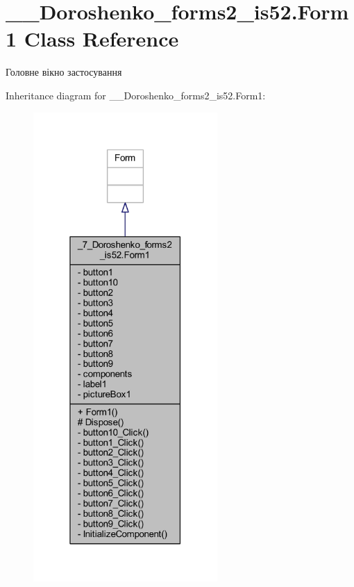 \hypertarget{class__7___doroshenko__forms2__is52_1_1_form1}{}\section{\+\_\+\_\+\+Doroshenko\+\_\+forms2\+\_\+is52.\+Form1 Class Reference}
\label{class__7___doroshenko__forms2__is52_1_1_form1}


Головне вікно застосування  




Inheritance diagram for \+\_\+\_\+\+Doroshenko\+\_\+forms2\+\_\+is52.\+Form1\+:
\nopagebreak
\begin{figure}[H]
\begin{center}
\leavevmode
\includegraphics[width=199pt]{class__7___doroshenko__forms2__is52_1_1_form1__inherit__graph}
\end{center}
\end{figure}


